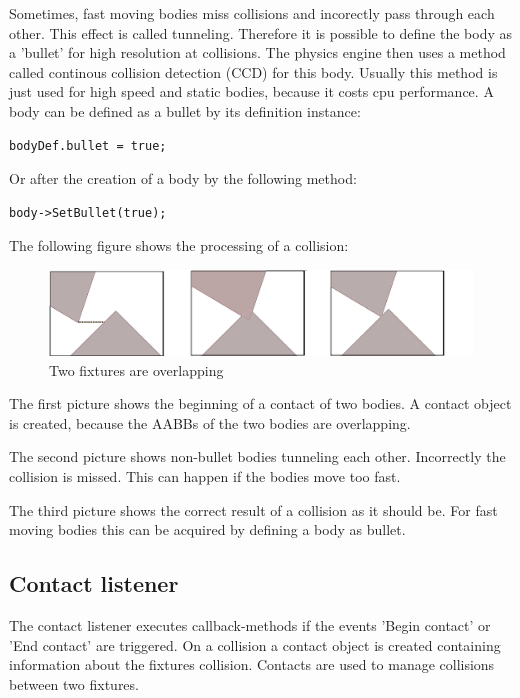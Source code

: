 \documentclass[10pt,a4paper,DIV=11]{scrreprt}
\begin{document}
Sometimes, fast moving bodies miss collisions and incorectly pass through each other. This effect is called tunneling. Therefore it is possible to define the body as a 'bullet' for high resolution at collisions. The physics engine then uses a method called continous collision detection (CCD)\cite{ccd} for this body. Usually this method is just used for high speed and static bodies, because it costs cpu performance. 
A body can be defined as a bullet by its definition instance:

\begin{lstlisting}[caption={Define fixture as bullet before creation},label=lst:fixture-bullet-before]
bodyDef.bullet = true;
\end{lstlisting}

Or after the creation of a body by the following method:

\begin{lstlisting}[caption={Define fixture as bullet after creation},label=lst:fixture-bullet-after]
body->SetBullet(true);
\end{lstlisting}

The following figure shows the processing of a collision:

\begin{center}
	\begin{figure}[H]
		\centering
		\includegraphics[width=1.0\textwidth,scale=1.0]{files/fixtures-overlap.png}
		\caption{Two fixtures are overlapping \cite{iforce}}
		\label{fig:fixture-overlap}
	\end{figure}
\end{center}

The first picture shows the beginning of a contact of two bodies. A contact object is created, because the AABBs of the two bodies are overlapping.

The second picture shows non-bullet bodies tunneling each other. Incorrectly the collision is missed. This can happen if the bodies move too fast.

The third picture shows the correct result of a collision as it should be. For fast moving bodies this can be acquired by defining a body as bullet.

\subsection{Contact listener}
The contact listener executes callback-methods if the events 'Begin contact' or 'End contact' are triggered.
On a collision a contact object is created containing information about the fixtures collision.
Contacts are used to manage collisions between two fixtures.
\end{document}
